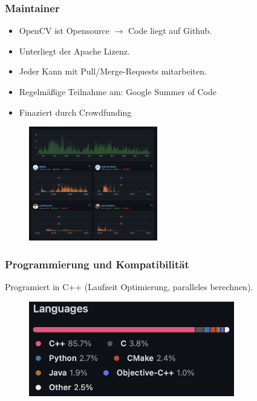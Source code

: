 \documentclass{beamer}
\begin{document}
\begin{frame} \frametitle{Maintainer}
	\begin{itemize}
		\item OpenCV ist Opensource $\rightarrow$ Code liegt auf Github.
		\item Unterliegt der Apache Lizenz.
		\item Jeder Kann mit  Pull/Merge-Requests mitarbeiten.
		\item Regelmäßige Teilnahme am: Google Summer of Code
		\item Finaziert durch Crowdfunding
	\end{itemize}
	\begin{figure}
		\centering
		\includegraphics[width=0.5\textwidth]{Bilder/maintainer.png}
		\label{a5}
	\end{figure}
	\cite{GitHub, Bradski2008}
\end{frame}



\begin{frame} \frametitle{Programmierung und Kompatibilität}
	Programiert in C++ (Laufzeit Optimierung, paralleles berechnen).
	\begin{figure}
		\centering
		\includegraphics[width=0.8\textwidth]{Bilder/CodeBase.png}
		\label{a4}
	\end{figure}
\cite{GitHub, Bradski2008}
\end{frame}
\end{document}
